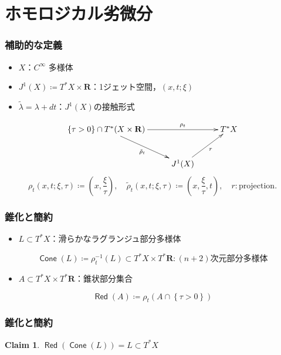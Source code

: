 \documentclass[dvipdfmx,12pt,aspectratio=169,leqno]{beamer}%
\newcommand{\rr}{\mathbf{R}}
\numberwithin{equation}{subsection}
\newcommand{\Red}{\mathop{\mathsf{Red}}\nolimits}
\newcommand{\Cone}{\mathop{\mathsf{Cone}}\nolimits}
\theoremstyle{mystyle}
\newtheorem{CLM}[AXM]{Claim}
\begin{document}
\section[劣微分]{ホモロジカル劣微分}

\begin{frame}
    \frametitle{補助的な定義}

    \begin{itemize}
        \item \(X\)：\(C^\infty\) 多様体
        \item \(J^{1}(X)\coloneqq T^{\ast}X\times \rr\)：1ジェット空間，\((x,t;\xi)\)
        \item \(\tilde{\lambda}=\lambda+dt\)：\(J^{1}(X)\)の接触形式
    \end{itemize}
    
    \[
        \vcenter{\xymatrix@C=26pt@R=26pt{
        \left\{\tau>0\right\}\cap T^{\ast}(X\times\rr)
        \ar[rd]_-{\tilde{\rho}_{t}}
        \ar[rr]^-{\rho_{t}}
        &&
        T^{\ast}X
        \\
        &
        J^{1}(X)
        \ar[ru]_-{r}
      }}
    \]
    \[
        \rho_{t}\left(x,t;\xi,\tau\right)
        \coloneqq
        \left(x,\frac{\xi}{\tau}\right),
        \quad
        \tilde{\rho}_{t}\left(x,t;\xi,\tau\right)
        \coloneqq
        \left(x,\frac{\xi}{\tau},t\right),
        \quad
        r\colon\text{projection}.
    \]

\end{frame}

\begin{frame}
    \frametitle{錐化と簡約}
    \begin{definition}
        \begin{itemize}
            \item \(L\subset T^{\ast}X\)：滑らかなラグランジュ部分多様体
        \end{itemize}
        \[
            \Cone(L)\coloneqq
            \rho_{t}^{-1}(L)\subset 
            T^{\ast}X\times T^{\ast}\rr
            \colon\text{\((n+2)\)次元部分多様体}
        \]
    \end{definition}
    
    \begin{definition}
        \begin{itemize}
            \item \(A\subset T^{\ast}X\times T^{\ast}\rr\)：錐状部分集合
        \end{itemize}
        \[\Red(A)\coloneqq\rho_{t}(A\cap\left\{\tau>0\right\})\]
    \end{definition}

\end{frame}
\begin{frame}
    \frametitle{錐化と簡約}

    \begin{CLM}
        \(\Red(\Cone(L))=L\subset T^{\ast}X\)
    \end{CLM}
\end{frame}
\end{document}
